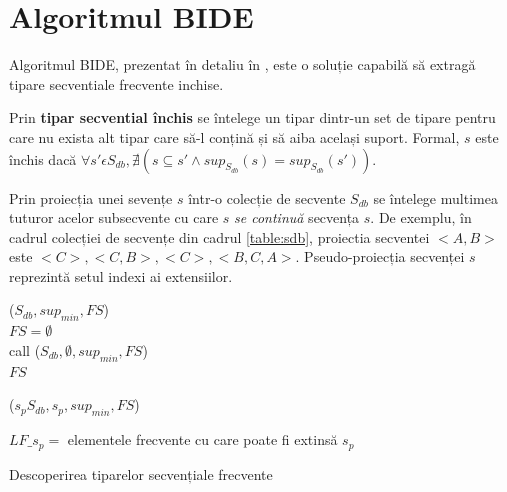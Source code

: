 \section{Algoritmul BIDE}
Algoritmul BIDE, prezentat în detaliu în \cite{bib:wang2004bide}, este o soluție capabilă să extragă tipare secventiale frecvente inchise.

\begin{defi}
Prin \textbf{tipar secvential închis} se întelege un tipar dintr-un set de tipare pentru care nu exista alt tipar care să-l conțină și să aiba același suport. Formal, $s$ este închis dacă $\forall s' \epsilon S_{db}, \nexists (s \subseteq s' \wedge sup_{S_{db}}(s)=sup_{S_{db}}(s'))$.
\end{defi}  

\begin{defi}
Prin proiecția unei sevențe $s$ într-o colecție de secvente $S_{db}$ se întelege multimea tuturor acelor subsecvente cu care $s$ \textit{se continuă} secvența $s$. De exemplu, în cadrul colecției de secvențe din cadrul \ref{table:sdb}, proiectia secventei $<A,B>$ este {$<C>,<C, B>,<C>,<B, C, A>$}. Pseudo-proiecția secvenței $s$ reprezintă setul indexi ai extensiilor. 
\end{defi}  


\begin{algorithm}[H]
\SetAlgoLined
{}
\fse($S_{db}, sup_{min}, FS$) \\
$FS = \emptyset$ \\
call \fs($S_{db}, \emptyset, sup_{min}, FS$) \\
\KwRet $FS$ \\

\BlankLine
\BlankLine

\fs($s_pS_{db}, s_p, sup_{min}, FS$) \\


$LF\_s_p =$ elementele frecvente cu care poate fi extinsă $s_p$

 {
\KwRet
}

\caption{Descoperirea tiparelor secvențiale frecvente}
\label{algo:fse}
\end{algorithm}

